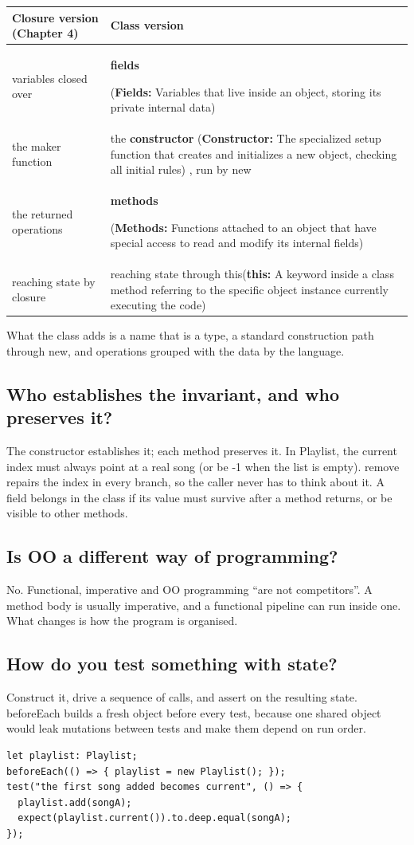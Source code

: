 \documentclass[10pt]{article}
\newcommand{\code}[1]{{\ttfamily\small #1}}
\newcommand{\term}[3][]{%
  \hypertarget{t:#2}{\textbf{#3}}%
  \if\relax\detokenize{#1}\relax\else%
    {\thinspace\footnotesize\color{black!65}(#1)}%
  \fi%
}
\renewcommand{\footnote}[1]{{\thinspace\footnotesize\color{black!65}(#1)}}
\begin{document}
\begin{tabularx}{\linewidth}{@{}XX@{}}
\toprule
Closure version (Chapter 4) & Class version \\ \midrule
variables closed over & \term[\textbf{Fields:} Variables that live inside an object, storing its private internal data]{field}{fields} \\
the maker function & the \term[\textbf{Constructor:} The specialized setup function that creates and initializes a new object, checking all initial rules]{constructor}{constructor}, run by \code{new} \\
the returned operations & \term[\textbf{Methods:} Functions attached to an object that have special access to read and modify its internal fields]{method}{methods} \\
reaching state by closure & reaching state through \code{this}\footnote{\textbf{this:} A keyword inside a class method referring to the specific object instance currently executing the code} \\ \bottomrule
\end{tabularx}

What the class adds is a name that is a type, a standard construction path through \code{new}, and operations grouped with the data by the language.

\subsection{Who establishes the invariant, and who preserves it?}
The constructor establishes it; each method preserves it. In \code{Playlist}, the current index must always point at a real song (or be \code{-1} when the list is empty). \code{remove} repairs the index in every branch, so the caller never has to think about it. A field belongs in the class if its value must survive after a method returns, or be visible to other methods.

\subsection{Is OO a different way of programming?}
No. Functional, imperative and OO programming ``are not competitors''. A method body is usually imperative, and a functional pipeline can run inside one. What changes is how the program is organised.

\subsection{How do you test something with state?}
Construct it, drive a sequence of calls, and assert on the resulting state. \code{beforeEach} builds a fresh object before every test, because one shared object would leak mutations between tests and make them depend on run order.
\begin{lstlisting}
let playlist: Playlist;
beforeEach(() => { playlist = new Playlist(); });
test("the first song added becomes current", () => {
  playlist.add(songA);
  expect(playlist.current()).to.deep.equal(songA);
});
\end{lstlisting}
\end{document}
